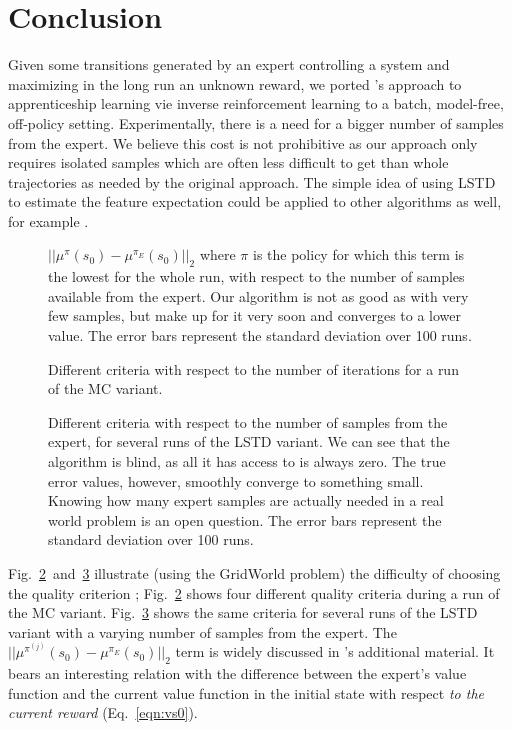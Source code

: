 \documentclass{jfpda2011}
\begin{document}
\section{Conclusion}
\label{sec:conclusion}
Given some transitions generated by an expert controlling a system and maximizing in the long run an unknown reward, we ported \citet{abbeel2004apprenticeship}'s approach to apprenticeship learning vie inverse reinforcement learning to a batch, model-free, off-policy setting. Experimentally, there is a need for a bigger number of samples from the expert. We believe this cost is not prohibitive as our approach only requires isolated samples which are often less difficult to get than whole trajectories as needed by the original approach.
The simple idea of using LSTD to estimate the feature expectation could be applied to other algorithms as well, for example \citep{abbeel2004apprenticeship,syed2008apprenticeship,syed2008game,ziebart2008maximum}.\\
\begin{figure}
\centering

\caption{$||\mu^{\pi}(s_0) - \mu^{\pi_E}(s_0)||_2$ where $\pi$ is the policy for which this term is the lowest for the whole run, with respect to the number of samples available from the expert. Our algorithm is not as good as \citet{abbeel2004apprenticeship} with very few samples, but make up for it very soon and converges to a lower value. The error bars represent the standard deviation over 100 runs.}
\label{fig:E}
\end{figure}
\begin{figure}
\centering

\caption{Different criteria with respect to the number of iterations for a run of the MC variant.}
\label{fig:A}
\end{figure}
\begin{figure}
\centering

\caption{Different criteria with respect to the number of samples from the expert, for several runs of the LSTD variant. We can see that the algorithm is blind, as all it has access to is always zero. The true error values, however, smoothly converge to something small. Knowing how many expert samples are actually needed in a real world problem is an open question. The error bars represent the standard deviation over 100 runs.}
\label{fig:B}
\end{figure}

Fig.~\ref{fig:A}~and~\ref{fig:B} illustrate (using the GridWorld problem) the difficulty of choosing the quality criterion ; Fig.~\ref{fig:A} shows four different quality criteria during a run of the MC variant. Fig.~\ref{fig:B} shows the same criteria for several runs of the LSTD variant with a varying number of samples from the expert. The $||\mu^{\pi^{(j)}}(s_0) - \mu^{\pi_E}(s_0)||_2$ term is widely discussed in \citep{abbeel2004apprenticeship}'s additional material. It bears an interesting relation with the difference between the expert's value function and the current value function in the initial state with respect \emph{to the current reward} (Eq.~\ref{eqn:vs0}).\\
\end{document}
